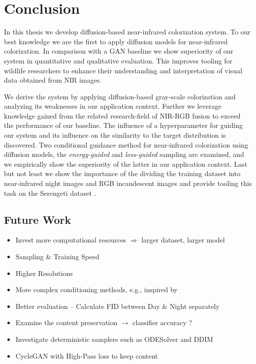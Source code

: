 \chapter{Conclusion}
In this thesis we develop diffusion-based near-infrared colorization system. 
To our best knowledge we are the first to apply diffusion models for near-infrared colorization.
In comparison with a GAN baseline \parencite{mehri} we show superiority of our system in quantitative and qualitative evaluation.
This improves tooling for wildlife researchers to enhance their understanding and interpretation of visual data obtained from NIR images.

We derive the system by applying diffusion-based gray-scale colorization \parencite{sbgm} and analyzing its weaknesses in our application context.
Further we leverage knowledge gained from the related research-field of NIR-RGB fusion \parencite{study-vis-nir-fusion} to exceed the performance of our baseline.
The influence of a hyperparameter for guiding our system and its influence on the similarity to the target distribution is discovered.
Two conditional guidance method for near-infrared colorization using diffusion models, the \textit{energy-guided} and \textit{loss-guided} sampling 
are examined, and we empirically show the superiority of the latter in our application context.
Last but not least we show the importance of the dividing the training dataset into near-infrared night images and RGB incandescent images
and provide tooling this task on the Serengeti dataset \parencite{serengeti}.



\section{Future Work} 
\label{sec:future-work}


\begin{itemize}
    \item Invest more computational resources $\Rightarrow$ larger dataset, larger model 
    \item Sampling \& Training Speed
    \item Higher Resolutions
    \item More complex conditioning methods, e.g., inspired by \textcite{study-vis-nir-fusion}
    \item Better evaluation -- Calculate FID between Day \& Night separately
    \item Examine the content preservation $\rightarrow$ classifier accuracy ?  
    \item Investigate deterministic samplers such as ODESolver \parencite{sbgm} and DDIM \parencite{ddim}
    \item CycleGAN with High-Pass loss to keep content
\end{itemize}